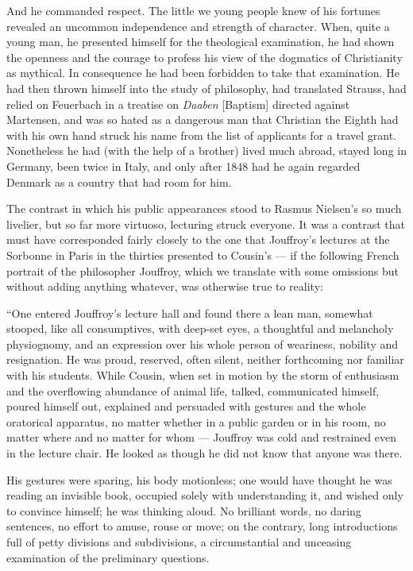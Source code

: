 \documentclass[12pt,a4paper,openany]{book}
\newcommand{\opage}[1]{\marginnote{\footnotesize\textit{[#1]}}}
\begin{document}
And he commanded respect. The little we young people knew of his fortunes
revealed an uncommon independence and strength of character. When, quite a
young man, he presented himself for the theological examination, he had shown
the openness and the courage to profess his view of the dogmatics of
Christianity as mythical. In consequence he had been forbidden to take that
examination. He had then thrown himself into the study of philosophy, had
translated Strauss, had relied on Feuerbach in a treatise on \textit{Daaben}
[Baptism] directed against Martensen, and was so hated as a dangerous man that
Christian the Eighth had with his own hand struck his name from the list of
applicants for a travel
\opage{234}grant. Nonetheless he had (with the help of a brother) lived much abroad,
stayed long in Germany, been twice in Italy, and only after 1848 had he again
regarded Denmark as a country that had room for him.

The contrast in which his public appearances stood to Rasmus Nielsen's so much
livelier, but so far more virtuoso, lecturing struck everyone. It was a
contrast that must have corresponded fairly closely to the one that
Jouffroy's lectures at the Sorbonne in Paris in the thirties presented to
Cousin's --- if the following French portrait of the philosopher Jouffroy,
which we translate with some omissions but without adding anything whatever,
was otherwise true to reality:

``One entered Jouffroy's lecture hall and found there a lean man, somewhat
stooped, like all consumptives, with deep-set eyes, a thoughtful and
melancholy physiognomy, and an expression over his whole person of weariness,
nobility and resignation. He was proud, reserved, often silent, neither
forthcoming nor familiar with his students. While Cousin, when set in motion
by the storm of enthusiasm and the overflowing abundance of animal life,
talked, communicated himself, poured himself out,
\opage{235}explained and persuaded with gestures and the whole oratorical apparatus, no
matter whether in a public garden or in his room, no matter where and no
matter for whom --- Jouffroy was cold and restrained even in the lecture
chair. He looked as though he did not know that anyone was there.

His gestures were sparing, his body motionless; one would have thought he was
reading an invisible book, occupied solely with understanding it, and wished
only to convince himself; he was thinking aloud. No brilliant words, no daring
sentences, no effort to amuse, rouse or move; on the contrary, long
introductions full of petty divisions and subdivisions, a circumstantial and
unceasing examination of the preliminary questions.
\end{document}
